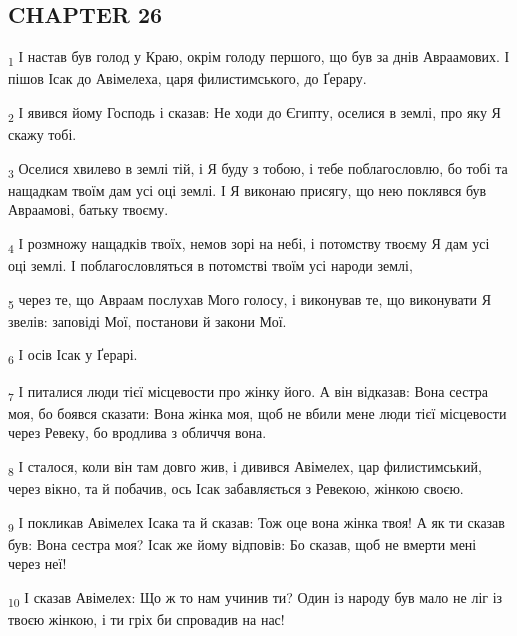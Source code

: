 \subsection{CHAPTER 26}
\begin{tcolorbox}
\textsubscript{1} І настав був голод у Краю, окрім голоду першого, що був за днів Авраамових. І пішов Ісак до Авімелеха, царя филистимського, до Ґерару.
\end{tcolorbox}
\begin{tcolorbox}
\textsubscript{2} І явився йому Господь і сказав: Не ходи до Єгипту, оселися в землі, про яку Я скажу тобі.
\end{tcolorbox}
\begin{tcolorbox}
\textsubscript{3} Оселися хвилево в землі тій, і Я буду з тобою, і тебе поблагословлю, бо тобі та нащадкам твоїм дам усі оці землі. І Я виконаю присягу, що нею поклявся був Авраамові, батьку твоєму.
\end{tcolorbox}
\begin{tcolorbox}
\textsubscript{4} І розмножу нащадків твоїх, немов зорі на небі, і потомству твоєму Я дам усі оці землі. І поблагословляться в потомстві твоїм усі народи землі,
\end{tcolorbox}
\begin{tcolorbox}
\textsubscript{5} через те, що Авраам послухав Мого голосу, і виконував те, що виконувати Я звелів: заповіді Мої, постанови й закони Мої.
\end{tcolorbox}
\begin{tcolorbox}
\textsubscript{6} І осів Ісак у Ґерарі.
\end{tcolorbox}
\begin{tcolorbox}
\textsubscript{7} І питалися люди тієї місцевости про жінку його. А він відказав: Вона сестра моя, бо боявся сказати: Вона жінка моя, щоб не вбили мене люди тієї місцевости через Ревеку, бо вродлива з обличчя вона.
\end{tcolorbox}
\begin{tcolorbox}
\textsubscript{8} І сталося, коли він там довго жив, і дивився Авімелех, цар филистимський, через вікно, та й побачив, ось Ісак забавляється з Ревекою, жінкою своєю.
\end{tcolorbox}
\begin{tcolorbox}
\textsubscript{9} І покликав Авімелех Ісака та й сказав: Тож оце вона жінка твоя! А як ти сказав був: Вона сестра моя? Ісак же йому відповів: Бо сказав, щоб не вмерти мені через неї!
\end{tcolorbox}
\begin{tcolorbox}
\textsubscript{10} І сказав Авімелех: Що ж то нам учинив ти? Один із народу був мало не ліг із твоєю жінкою, і ти гріх би спровадив на нас!
\end{tcolorbox}
